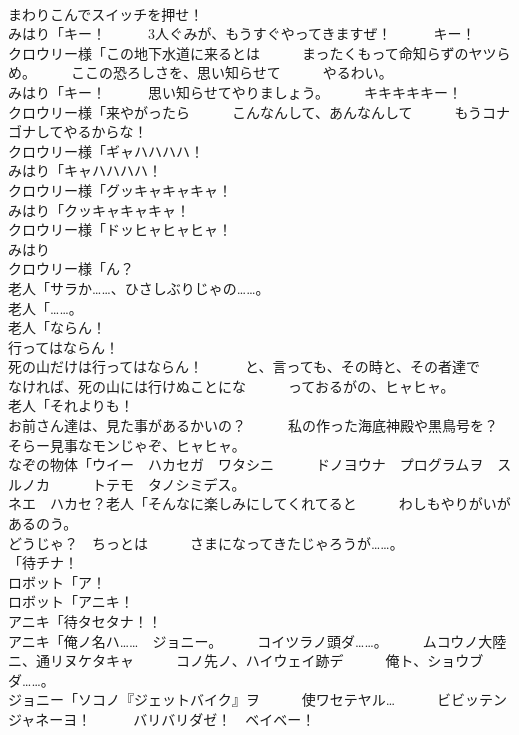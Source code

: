 \documentclass[8pt]{extreport}
\begin{document}
\begin{CJK}{UTF8}{min}
\\	まわりこんでスイッチを押せ！	
\\	みはり「キー！　　　3人ぐみが、もうすぐやってきますぜ！　　　キー！	
\\	クロウリー様「この地下水道に来るとは　　　まったくもって命知らずのヤツらめ。　　　ここの恐ろしさを、思い知らせて　　　やるわい。	
\\	みはり「キー！　　　思い知らせてやりましょう。　　　キキキキキー！	
\\	クロウリー様「来やがったら　　　こんなんして、あんなんして　　　もうコナゴナしてやるからな！	
\\	クロウリー様「ギャハハハハ！	
\\	みはり「キャハハハハ！	
\\	クロウリー様「グッキャキャキャ！	
\\	みはり「クッキャキャキャ！	
\\	クロウリー様「ドッヒャヒャヒャ！	
\\	みはり
\\	クロウリー様「ん？	
\\	老人「サラか……、ひさしぶりじゃの……。	
\\	老人「……。	
\\	老人「ならん！	
\\	行ってはならん！	
\\	死の山だけは行ってはならん！　　　と、言っても、その時と、その者達で　　　なければ、死の山には行けぬことにな　　　っておるがの、ヒャヒャ。	
\\	老人「それよりも！	
\\	お前さん達は、見た事があるかいの？　　　私の作った海底神殿や黒鳥号を？　　　そらー見事なモンじゃぞ、ヒャヒャ。	
\\	なぞの物体「ウイー　ハカセガ　ワタシニ　　　ドノヨウナ　プログラムヲ　スルノカ　　　トテモ　タノシミデス。	
\\	ネエ　ハカセ？老人「そんなに楽しみにしてくれてると　　　わしもやりがいがあるのう。	
\\	どうじゃ？　ちっとは　　　さまになってきたじゃろうが……。	
\\	「待チナ！	
\\	ロボット「ア！	
\\	ロボット「アニキ！	
\\	アニキ「待タセタナ！！	
\\	アニキ「俺ノ名ハ……　ジョニー。　　　コイツラノ頭ダ……。　　　ムコウノ大陸ニ、通リヌケタキャ　　　コノ先ノ、ハイウェイ跡デ　　　俺ト、ショウブダ……。	
\\	ジョニー「ソコノ『ジェットバイク』ヲ　　　使ワセテヤル…　　　ビビッテンジャネーヨ！　　　バリバリダゼ！　ベイベー！	

\end{CJK}
\end{document}
